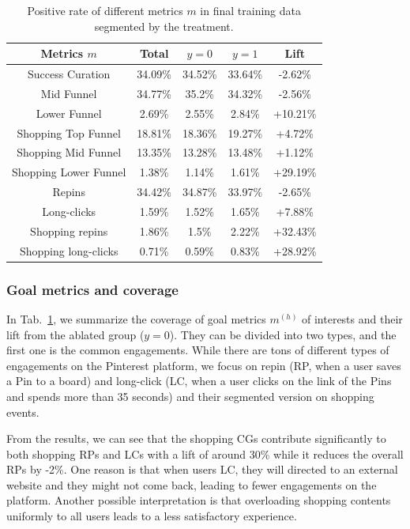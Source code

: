 \documentclass[sigconf, authorversion]{acmart}
\begin{document}
\begin{table}[h]
  \caption{Positive rate of different metrics $m$ in final training data segmented by the treatment.}
  \label{tab:event_stats}
  \begin{tabular}{ccccc}
    \toprule
    Metrics $m$ & Total & $y=0$ & $y=1$ & Lift  \\
    \hline
    Success Curation & 34.09\% & 34.52\% & 33.64\% & -2.62\% \\
    Mid Funnel & 34.77\% & 35.2\% & 34.32\% & -2.56\% \\
    Lower Funnel & 2.69\% & 2.55\% & 2.84\% & +10.21\% \\
    Shopping Top Funnel & 18.81\% & 18.36\% & 19.27\% & +4.72\% \\
    Shopping Mid Funnel & 13.35\% & 13.28\% & 13.48\% & +1.12\% \\
    Shopping Lower Funnel & 1.38\% & 1.14\% & 1.61\% & +29.19\% \\
    Repins & 34.42\% & 34.87\% & 33.97\% & -2.65\% \\
    Long-clicks & 1.59\% & 1.52\% & 1.65\% & +7.88\% \\
    Shopping repins & 1.86\% & 1.5\% & 2.22\% & +32.43\% \\
    Shopping long-clicks & 0.71\% & 0.59\% & 0.83\% & +28.92\% \\
    \bottomrule
  \end{tabular}
\end{table}

\subsubsection{Goal metrics and coverage} In Tab.~\ref{tab:event_stats}, we summarize the coverage of goal metrics $m^{(h)}$ of interests and their lift from the ablated group ($y=0$). They can be divided into two types, and the first one is the common engagements. While there are tons of different types of engagements on the Pinterest platform, we focus on repin (RP, when a user saves a Pin to a board) and long-click (LC, when a user clicks on the link of the Pins and spends more than 35 seconds) and their segmented version on shopping events.

From the results, we can see that the shopping CGs contribute significantly to both shopping RPs and LCs with a lift of around 30\% while it reduces the overall RPs by -2\%. One reason is that when users LC, they will directed to an external website and they might not come back, leading to fewer engagements on the platform. Another possible interpretation is that overloading shopping contents uniformly to all users leads to a less satisfactory experience.
\end{document}
